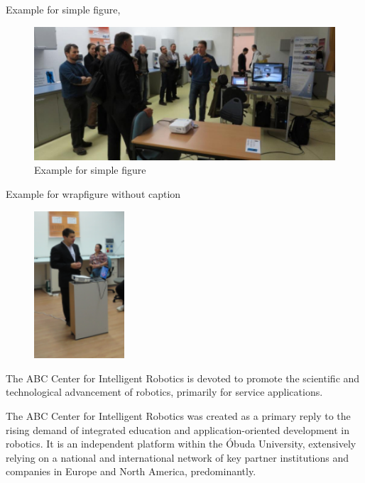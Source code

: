 \documentclass{beamer}
\begin{document}
	\begin{frame}{Example for simple figure,}
		
		\begin{figure}
		\centering
		\includegraphics[width=\linewidth]{img/example_fig_1}
		\caption{Example for simple figure}
		\label{fig:example_fig_1}
		\end{figure}

	\end{frame}
	
	\begin{frame}{Example for wrapfigure without caption}
		
		\begin{figure} %
			\vspace{-20pt}
			\begin{center}
				\includegraphics[width=0.3\textwidth]{img/example_fig_2}
				\label{fig:example_fig_2}
			\end{center}
			\vspace{-20pt}
			\vspace{1pt}
		\end{figure} 
		The ABC Center for Intelligent Robotics is devoted to promote the scientific and technological advancement of robotics, primarily for service applications.
		
		\vspace*{2mm}
		
		The ABC Center for Intelligent Robotics was created as a primary reply to the rising demand of integrated education and application-oriented development in robotics. It is an independent platform within the Óbuda University, extensively relying on a national and international network of key partner institutions and companies in Europe and North America, predominantly.

	\end{frame}
	
\end{document}
